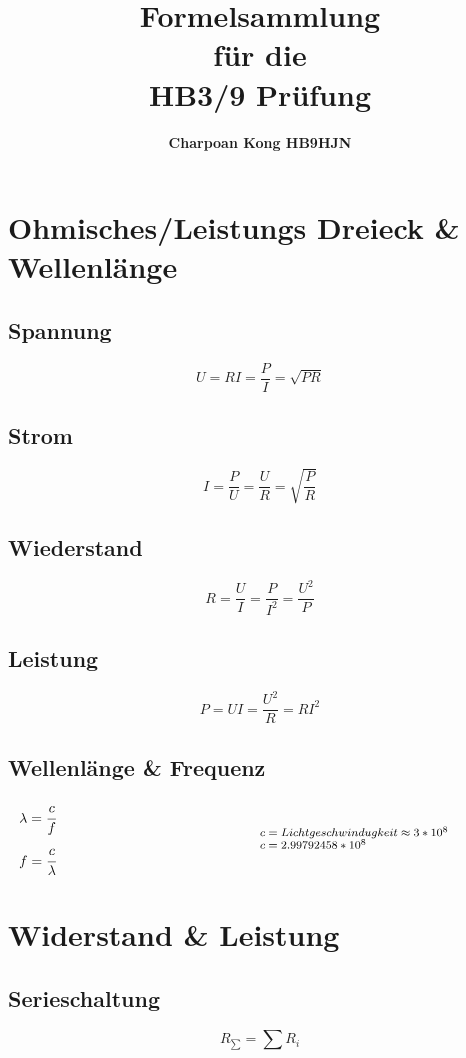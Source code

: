 \documentclass[12pt,a5paper,ngerman,titlepage]{article}
\title{\Huge \textbf{Formelsammlung} \\ \large für die \\HB3/9 Prüfung}
\author{\textbf{Charpoan Kong HB9HJN}}
\date{}
\begin{document}
\maketitle
{}
\tableofcontents
\newpage
{}%
\section{Ohmisches/Leistungs Dreieck \& Wellenlänge}
\subsection{Spannung}

$$U=RI =\frac{P}{I} = \sqrt{PR}$$

\subsection{Strom}
$$I=\frac{P}{U}=\frac{U}{R}=\sqrt{\frac{P}{R}} $$

\subsection{Wiederstand}
$$R=\frac{U}{I}=\frac{P}{I^2}=\frac{U^2}{P} $$

\subsection{Leistung}
$$P=UI =\frac{U^2}{R} =RI^2$$
\subsection{Wellenlänge \& Frequenz}
\[
\begin{minipage}{.5\linewidth}
  $\lambda=\cfrac{c}{f}$ \\[5pt]
  $f=\cfrac{c}{\lambda}$
\end{minipage}%
\begin{minipage}{.5\linewidth}
  \fontsize{8pt}{9pt}\selectfont
  $c = Lichtgeschwindugkeit \approx 3*10^{8}$ \\
  $c = 2.99792458*10^{8}$

\end{minipage}
\]
\newpage
\section{Widerstand \& Leistung}
\subsection{Serieschaltung}
$$R_{\sum} = \sum R_{i}$$
\end{document}
